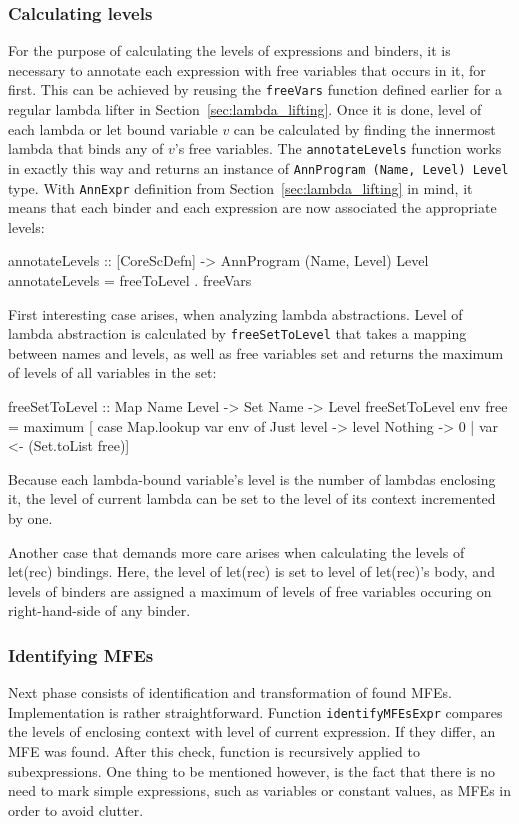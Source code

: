 \documentclass[12pt,a4paper]{report}
\begin{document}
\subsubsection{Calculating levels}
For the purpose of calculating the levels of expressions and binders, it is
necessary to annotate each expression with free variables that occurs in it,
for first. This can be achieved by reusing the \texttt{freeVars} function defined
earlier for a regular lambda lifter in Section~\ref{sec:lambda_lifting}. Once
it is done, level of each lambda or let bound variable $v$ can be calculated by
finding the innermost lambda that binds any of $v$'s free variables. The
\texttt{annotateLevels} function works in exactly this way and returns an
instance of \texttt{AnnProgram (Name, Level) Level} type. With \texttt{AnnExpr}
definition from Section~\ref{sec:lambda_lifting} in mind, it means that each
binder and each expression are now associated the appropriate levels:

\vspace*{0.2in}
\begin{code}[style=haskell]
  annotateLevels :: [CoreScDefn] -> AnnProgram (Name, Level) Level
  annotateLevels = freeToLevel . freeVars
\end{code}

First interesting case arises, when analyzing lambda abstractions. Level of
lambda abstraction is calculated by \texttt{freeSetToLevel} that takes a
mapping between names and levels, as well as free variables set and returns the
maximum of levels of all variables in the set:

\vspace*{0.2in}
\begin{code}[style=haskell]
  freeSetToLevel :: Map Name Level -> Set Name -> Level
  freeSetToLevel env free =
      maximum [ case Map.lookup var env of
          Just level -> level
          Nothing -> 0 | var <- (Set.toList free)]
\end{code}

Because each lambda-bound variable's level is the number of lambdas enclosing
it, the level of current lambda can be set to the level of its context
incremented by one.

Another case that demands more care arises when calculating the levels of
let(rec) bindings. Here, the level of let(rec) is set to level of let(rec)'s
body, and levels of binders are assigned a maximum of levels of free variables
occuring on right-hand-side of any binder.

\subsubsection{Identifying MFEs}
Next phase consists of identification and transformation of found MFEs.
Implementation is rather straightforward. Function \texttt{identifyMFEsExpr}
compares the levels of enclosing context with level of current expression. If
they differ, an MFE was found. After this check, function is recursively
applied to subexpressions. One thing to be mentioned however, is the fact that
there is no need to mark simple expressions, such as variables or constant
values, as MFEs in order to avoid clutter.
\end{document}
